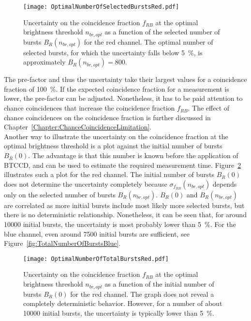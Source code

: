 \begin{figure}[h]
	\centering
	\texttt{[image: OptimalNumberOfSelectedBurstsRed.pdf]}
	\caption[Optimal number of selected bursts for red channel]{Uncertainty on the coincidence fraction $f_{RB}$ at the optimal brightness threshold $n_{br,opt}$ as a function of the selected number of bursts $B_R(n_{br,opt})$ for the red channel. The optimal number of selected bursts, for which the uncertainty falls below \SI{5}{\percent}, is approximately $B_R(n_{br,opt}) = 800$.}
	\label{fig:SelectedNumberOfBurstsRed}
\end{figure} 

The pre-factor and thus the uncertainty take their largest values for a coincidence fraction of \SI{100}{\percent}. If the expected coincidence fraction for a measurement is lower, the pre-factor can be adjusted. Nonetheless, it has to be paid attention to chance coincidences that increase the coincidence fraction $f_{RB}$. The effect of chance coincidences on the coincidence fraction is further discussed in Chapter~\ref{Chapter:ChanceCoincidenceLimitation}.\\

Another way to illustrate the uncertainty on the coincidence fraction at the optimal brightness threshold is a plot against the initial number of bursts $B_R(0)$. The advantage is that this number is known before the application of \gls{BTCCD}, and can be used to estimate the required measurement time. Figure~\ref{fig:TotalNumberOfBurstsRed} illustrates such a plot for the red channel. The initial number of bursts $B_R(0)$ does not determine the uncertainty completely because $\sigma_{f_{RB}}(n_{br,opt})$ depends only on the selected number of bursts $B_R(n_{br,opt})$. $B_R(0)$ and $B_R(n_{br,opt})$ are correlated as more initial bursts include most likely more selected bursts, but there is no deterministic relationship. Nonetheless, it can be seen that, for around \num{10000} initial bursts, the uncertainty is most probably lower than \SI{5}{\percent}. For the blue channel, even around \num{7500} initial bursts are sufficient, see Figure~\ref{fig:TotalNumberOfBurstsBlue}.

\begin{figure}[h]
	\centering
	\texttt{[image: OptimalNumberOfTotalBurstsRed.pdf]}
	\caption[Optimal number of initial bursts for red channel]{Uncertainty on the coincidence fraction $f_{RB}$ at the optimal brightness threshold $n_{br,opt}$ as a function of the initial number of bursts $B_R(0)$ for the red channel. The graph does not reveal a completely deterministic behavior. However, for a number of about \num{10000} initial bursts, the uncertainty is typically lower than \SI{5}{\percent}.}
	\label{fig:TotalNumberOfBurstsRed}
\end{figure} 


